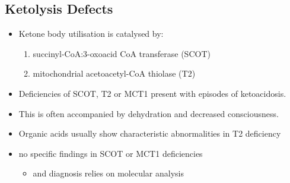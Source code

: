 \documentclass{scrartcl}
\begin{document}
\subsection{Ketolysis Defects}
\label{sec:orgfb116c1}
\begin{itemize}
\item Ketone body utilisation is catalysed by:
\begin{enumerate}
\item succinyl-CoA:3-oxoacid CoA transferase (SCOT)
\item mitochondrial acetoacetyl-CoA thiolase (T2)
\end{enumerate}
\item Deficiencies of SCOT, T2 or MCT1 present with episodes of ketoacidosis.
\item This is often accompanied by dehydration and decreased
consciousness.
\item Organic acids usually show characteristic abnormalities in T2
deficiency
\item no specific findings in SCOT or MCT1 deficiencies
\begin{itemize}
\item and diagnosis relies on molecular analysis
\end{itemize}
\end{itemize}
\end{document}
